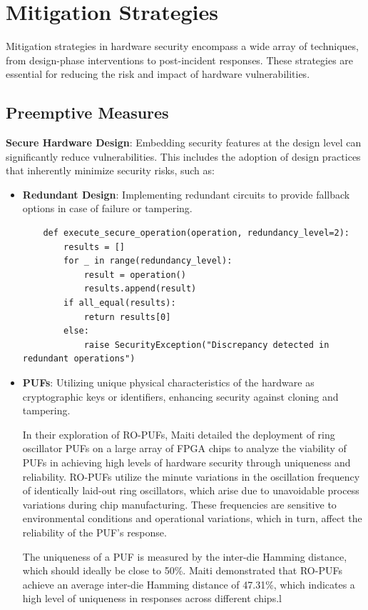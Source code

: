 \hypertarget{mitigation-strategies}{%
\section{Mitigation Strategies}\label{mitigation-strategies}}

Mitigation strategies in hardware security encompass a wide array of
techniques, from design-phase interventions to post-incident responses.
These strategies are essential for reducing the risk and impact of
hardware vulnerabilities.

\hypertarget{preemptive-measures}{%
\subsection{Preemptive Measures}\label{preemptive-measures}}

\textbf{Secure Hardware Design}: Embedding security features at the
design level can significantly reduce vulnerabilities. This includes the
adoption of design practices that inherently minimize security risks,
such as:

\begin{itemize}
\item
  \textbf{Redundant Design}: Implementing redundant circuits to provide
  fallback options in case of failure or tampering.

  \begin{verbatim}
    def execute_secure_operation(operation, redundancy_level=2):
        results = []
        for _ in range(redundancy_level):
            result = operation()
            results.append(result)
        if all_equal(results):
            return results[0] 
        else:
            raise SecurityException("Discrepancy detected in redundant operations")
    \end{verbatim}
    
\item
  \textbf{PUFs}: Utilizing unique
  physical characteristics of the hardware as cryptographic keys or
  identifiers, enhancing security against cloning and tampering.

  In their exploration of RO-PUFs\cite{maitiLargeScaleCharacterization2010}, Maiti detailed the deployment of ring oscillator PUFs on a large array of FPGA chips to analyze the viability of PUFs in achieving high levels of hardware security through uniqueness and reliability. RO-PUFs utilize the minute variations in the oscillation frequency of identically laid-out ring oscillators, which arise due to unavoidable process variations during chip manufacturing. These frequencies are sensitive to environmental conditions and operational variations, which in turn, affect the reliability of the PUF's response.

  The uniqueness of a PUF is measured by the inter-die Hamming distance, which should ideally be close to 50\%. Maiti demonstrated that RO-PUFs achieve an average inter-die Hamming distance of 47.31\%, which indicates a high level of uniqueness in responses across different chips.l
\end{itemize}

